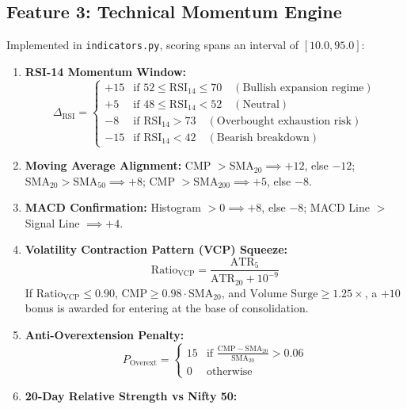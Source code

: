 \documentclass[11pt,a4paper]{article}
\begin{document}
\subsection{Feature 3: Technical Momentum Engine}
Implemented in \texttt{indicators.py}, scoring spans an interval of $[10.0, 95.0]$:
\begin{enumerate}[leftmargin=*]
    \item \textbf{RSI-14 Momentum Window:}
    \begin{equation}
    \Delta_{\text{RSI}} = \begin{cases}
    +15 & \text{if } 52 \le \text{RSI}_{14} \le 70 \quad (\text{Bullish expansion regime}) \\
    +5 & \text{if } 48 \le \text{RSI}_{14} < 52 \quad (\text{Neutral}) \\
    -8 & \text{if } \text{RSI}_{14} > 73 \quad (\text{Overbought exhaustion risk}) \\
    -15 & \text{if } \text{RSI}_{14} < 42 \quad (\text{Bearish breakdown})
    \end{cases}
    \end{equation}
    \item \textbf{Moving Average Alignment:} CMP $> \text{SMA}_{20} \implies +12$, else $-12$; $\text{SMA}_{20} > \text{SMA}_{50} \implies +8$; CMP $> \text{SMA}_{200} \implies +5$, else $-8$.
    \item \textbf{MACD Confirmation:} Histogram $> 0 \implies +8$, else $-8$; MACD Line $>$ Signal Line $\implies +4$.
    \item \textbf{Volatility Contraction Pattern (VCP) Squeeze:}
    \begin{equation}
    \text{Ratio}_{\text{VCP}} = \frac{\text{ATR}_5}{\text{ATR}_{20} + 10^{-9}}
    \end{equation}
    If $\text{Ratio}_{\text{VCP}} \le 0.90$, $\text{CMP} \ge 0.98 \cdot \text{SMA}_{20}$, and $\text{Volume Surge} \ge 1.25\times$, a $+10$ bonus is awarded for entering at the base of consolidation.
    \item \textbf{Anti-Overextension Penalty:}
    \begin{equation}
    P_{\text{Overext}} = \begin{cases} 15 & \text{if } \frac{\text{CMP} - \text{SMA}_{20}}{\text{SMA}_{20}} > 0.06 \\ 0 & \text{otherwise} \end{cases}
    \end{equation}
    \item \textbf{20-Day Relative Strength vs Nifty 50:}

\end{enumerate}
\end{document}

